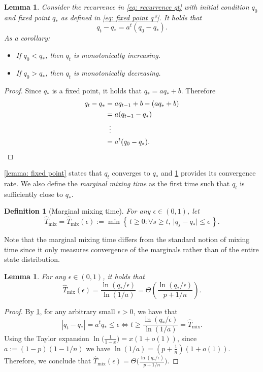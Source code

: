 \documentclass[11pt,a4paper]{article}
\newtheorem{lemma}[theorem]{Lemma}
\newtheorem{definition}[theorem]{Definition}
\newcommand{\Tmar}{\hat{T}_{\mathrm{mix}}}
\begin{document}
\begin{lemma}\label{lemma: monotonicity}
Consider the recurrence in \cref{eq: recurrence qt} with initial condition $q_0$ and fixed point $q_*$ as defined in \cref{eq: fixed point q*}.
It holds that
\[
    q_{t} - q_* = a^t (q_0 - q_*).
\]
As a corollary:
\begin{itemize}
    \item If $q_0 < q_*$, then $q_t$ is monotonically increasing.
    \item If $q_0 > q_*$, then $q_t$ is monotonically decreasing.
\end{itemize}
\end{lemma}
\begin{proof}
Since $q_*$ is a fixed point, it holds that $q_* = a q_* + b$.
Therefore
\begin{align*}
q_{t} - q_* &=a q_{t-1} + b - (a q_* + b) \\
&= a (q_{t-1} - q_*) \\
&\; \; \vdots \\
&= a^t (q_0 - q_*).
\qedhere
\end{align*}
\end{proof}

\cref{lemma: fixed point} states that $q_t$ converges to $q_*$ and \cref{lemma: monotonicity} provides its convergence rate.
We also define the \textit{marginal mixing time} as the first time such that $q_t$ is sufficiently close to $q_*$.

\begin{definition}[Marginal mixing time]\label{def: T_mix marginal}
For any $\epsilon \in (0,1)$, let
\begin{equation}\label{eq: T_mix marginal}
    \Tmar
    = \Tmar(\epsilon) 
    := \min\left\{\, t\ge 0: \forall s\ge t,\ \big|q_s -q_*\big|\le\epsilon \,\right\}.
\end{equation}
\end{definition}
Note that the marginal mixing time differs from the standard notion of mixing time \cite{levin2017markov} since it only measures convergence of the marginals rather than of the entire state distribution.

\begin{lemma}\label{lem:boundonTmix}
For any $\epsilon \in (0,1)$, it holds that
\[
    \Tmar(\epsilon)
    = \frac{\ln(q_*/\epsilon)}{\ln(1/a)} 
    = \Theta\left(\frac{\ln(q_*/\epsilon)}{p+1/n}\right).
\]
\end{lemma}
\begin{proof}
By \cref{lemma: monotonicity}, for any arbitrary small $\epsilon > 0$, we have that
\[
    |q_t - q_*| = a^t q_* \le \epsilon 
    \iff t \ge \frac{\ln(q_*/\epsilon)}{\ln(1/a)} = \Tmar.
\]
Using the Taylor expansion $\ln\big(\frac{1}{1-x}\big) = x(1+o(1))$, since $a := (1-p)(1-1/n)$ we have
$\ln(1/a) = \left(p+\frac{1}{n}\right)(1+o(1))$. 
Therefore, we conclude that
$\Tmar(\epsilon) = \Theta\big(\frac{\ln(q_*/\epsilon)}{p+1/n}\big)$.
\end{proof}
\end{document}
